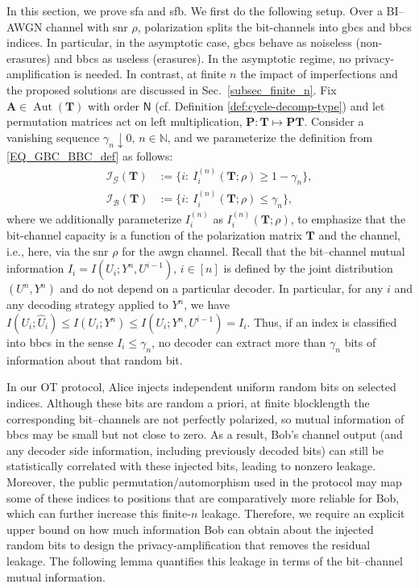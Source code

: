 \documentclass[onecolumn]{IEEEtran} %
\newcommand{\1}{\mathbbm{1}}
\DeclareMathOperator{\Aut}{Aut}
\theoremstyle{boldremark}
\newcommand{\bT}{\mathbf{T}}
\begin{document}
In this section, we prove \gls{sfa} and \gls{sfb}. We first do the following setup. Over a BI--AWGN channel with \gls{snr} $\rho$, polarization splits the bit-channels into \gls{gbcs} and \gls{bbcs} indices. In particular, in the asymptotic case, \gls{gbcs} behave as noiseless (non-erasures) and \gls{bbcs} as useless
(erasures). In the asymptotic regime, no privacy-amplification is needed. In contrast, at finite $n$ the impact of imperfections and the proposed solutions are discussed in Sec.~\ref{subsec_finite_n}. Fix $\mathbf A\in\Aut(\mathbf T)$ with order $\textsf{N}$ (cf. Definition \ref{def:cycle-decomp-type}) and let permutation matrices act on left multiplication, $\mathbf P:\mathbf T\mapsto \mathbf P\mathbf T$. Consider a vanishing sequence $\gamma_n\downarrow 0,\,n\in\mathds{N}$, and we parameterize the definition from \eqref{EQ_GBC_BBC_def} as follows:
\begin{align}
\mathcal{I}_{\mathcal G}(\mathbf T)&:=\{i:\ I_i^{(n)}(\mathbf T;\rho)\ge 1-\gamma_n\},\label{EQ_Def_GBC}\\
\mathcal{I}_{\mathcal B}(\mathbf T)&:=\{i:\ I_i^{(n)}(\mathbf T;\rho)\le \gamma_n\},\label{EQ_Def_BBC}
\end{align}
where we additionally parameterize $I_i^{(n)}$ as $I_i^{(n)}(\mathbf T;\rho)$, to emphasize that the bit-channel capacity is a function of the polarization matrix $\bT$ and the channel, i.e., here, via the \gls{snr} $\rho$ for the \gls{awgn} channel. Recall that the bit--channel mutual information
$I_i = I(U_i;Y^n,U^{i-1}),\,i\in [n]$ is defined by the joint
distribution $(U^n,Y^n)$ and do not depend on a particular decoder.
In particular, for any $i$ and any decoding strategy applied to $Y^n$, we have $I(U_i;\hat{U}_i)\le I(U_i;Y^n)\le I(U_i;Y^n,U^{i-1}) = I_i$. Thus, if an index is
classified into \gls{bbcs} in the sense $I_i\le\gamma_n$, no decoder can
extract more than $\gamma_n$ bits of information about that random bit.

In our OT protocol, Alice injects independent uniform random bits on selected
indices. Although these bits are random a priori, at finite blocklength the
corresponding bit--channels are not perfectly polarized, so mutual
information of \gls{bbcs} may be small but not close to zero. As a result, Bob's channel output
(and any decoder side information, including previously decoded bits) can still
be statistically correlated with these injected bits, leading to nonzero leakage.
Moreover, the public permutation/automorphism used in the protocol may map some
of these indices to positions that are comparatively more reliable for Bob,
which can further increase this finite-\(n\) leakage. Therefore, we require an
explicit upper bound on how much information Bob can obtain about the injected
random bits to design the privacy-amplification that removes the
residual leakage. The following lemma quantifies this leakage in terms of the
bit--channel mutual information.
\end{document}
